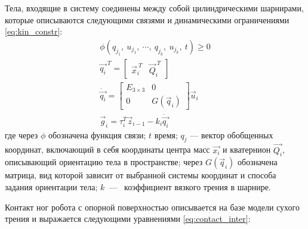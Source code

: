 Тела, входящие в систему соединены между собой цилиндрическими шарнирами, которые описываются следующими связями и динамическими ограничениями \eqref{eq:kin_constr}:
\begin{align}
    \label{eq:kin_constr}
    \phi(q_{j_1},\ u_{j_1},\ \cdots,\ q_{j_k},\ u_{j_k},\ t) \geqslant  0 \\
    \vec{q_i}^{\ T} = \begin{bmatrix}
        \vec{x}_i^{\ T} & \vec{Q}_i^{\ T}
    \end{bmatrix} \\
    \dot{\vec{q_i}} = \begin{bmatrix}
    E_{3\times3} & 0\\ 
    0 & G(\vec{q}_i) 
    \end{bmatrix}\vec{u}_i  \\
    \vec{g}_i = \tau_i^T \vec{z}_{i-1} -k_i \dot{\vec{q_i}}
\end{align}
где через $\phi$ обозначена функция связи; $t$ время; $q_{j}$ --- вектор обобщенных координат, включающий в себя координаты центра масс $\vec{x_i}$ и кватернион $\vec{Q_i}$, описывающий ориентацию тела в пространстве; через $G(\vec{q}_i)$ обозначена матрица, вид которой зависит от выбранной системы координат и способа задания ориентации тела; $k$~---~ коэффициент вязкого трения в шарнире.

Контакт ног робота с опорной поверхностью  описывается на базе модели сухого трения и выражается следующими уравнениями \eqref{eq:contact_inter}:


